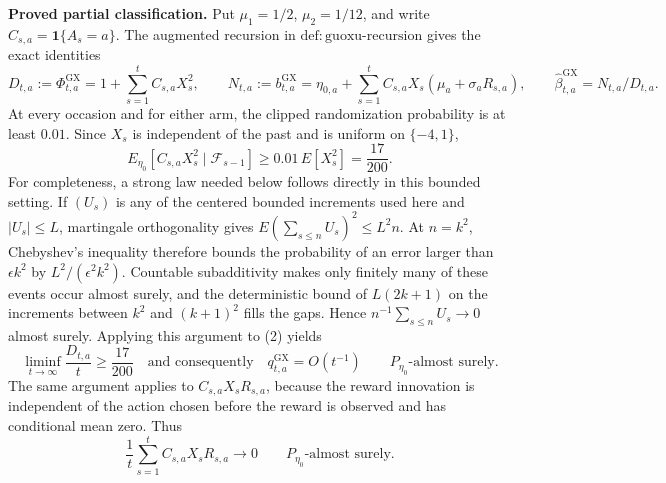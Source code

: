 \textbf{Proved partial classification.}
Put \(\mu _1=1/2\), \(\mu _2=1/12\), and write
\(C_{s,a}=\mathbf 1\{A_s=a\}\).  The augmented recursion in
\(\mathrm{def{:}guoxu\text{-}recursion}\) gives the exact identities
\[
 D_{t,a}:=\Phi^{\mathrm{GX}}_{t,a}
 =1+\sum_{s=1}^t C_{s,a}X_s^2,
 \qquad
 N_{t,a}:=b^{\mathrm{GX}}_{t,a}
 =\eta_{0,a}+\sum_{s=1}^t C_{s,a}X_s
       (\mu_a+\sigma_aR_{s,a}),
 \qquad
 \widehat\beta^{\mathrm{GX}}_{t,a}=N_{t,a}/D_{t,a}.
 \tag{1}
\]
At every occasion and for either arm, the clipped randomization probability
is at least \(0.01\).  Since \(X_s\) is independent of the past and is
uniform on \(\{-4,1\}\),
\[
 E_{\eta_0}\!\left[C_{s,a}X_s^2\mid\mathcal F_{s-1}\right]
 \geq 0.01\,E[X_s^2]=\frac{17}{200}.
 \tag{2}
\]
For completeness, a strong law needed below follows directly in this bounded
setting.  If \((U_s)\) is any of the centered bounded increments used here
and \(|U_s|\leq L\), martingale orthogonality gives
\(E(\sum_{s\leq n}U_s)^2\leq L^2n\).  At \(n=k^2\), Chebyshev's inequality
therefore bounds the probability of an error larger than \(\epsilon k^2\)
by \(L^2/(\epsilon^2k^2)\).  Countable subadditivity makes only finitely many
of these events occur almost surely, and the deterministic bound of
\(L(2k+1)\) on the increments between \(k^2\) and \((k+1)^2\) fills the
gaps.  Hence \(n^{-1}\sum_{s\leq n}U_s\to0\) almost surely.  Applying this
argument to (2) yields
\[
 \liminf_{t\to\infty}\frac{D_{t,a}}t\geq\frac{17}{200}
 \quad\text{and consequently}\quad
 q^{\mathrm{GX}}_{t,a}=O(t^{-1})
 \qquad P_{\eta_0}\text{-almost surely}.
 \tag{3}
\]
The same argument applies to
\(C_{s,a}X_sR_{s,a}\), because the reward innovation is independent of the
action chosen before the reward is observed and has conditional mean zero.
Thus
\[
 \frac1t\sum_{s=1}^t C_{s,a}X_sR_{s,a}\longrightarrow0
 \qquad P_{\eta_0}\text{-almost surely}.
 \tag{4}
\]

